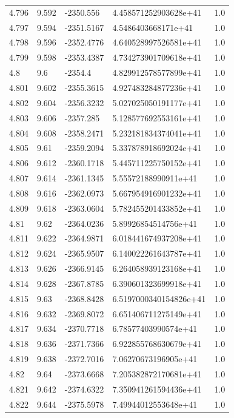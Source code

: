 \begin{tabular}{lllll}
4.796 & 9.592 & -2350.556 & 4.458571252903628e+41 & 1.0 \\
4.797 & 9.594 & -2351.5167 & 4.5486403668171e+41 & 1.0 \\
4.798 & 9.596 & -2352.4776 & 4.640528997526581e+41 & 1.0 \\
4.799 & 9.598 & -2353.4387 & 4.734273901709618e+41 & 1.0 \\
4.8 & 9.6 & -2354.4 & 4.829912578577899e+41 & 1.0 \\
4.801 & 9.602 & -2355.3615 & 4.927483284877236e+41 & 1.0 \\
4.802 & 9.604 & -2356.3232 & 5.027025050191177e+41 & 1.0 \\
4.803 & 9.606 & -2357.285 & 5.128577692553161e+41 & 1.0 \\
4.804 & 9.608 & -2358.2471 & 5.232181834374041e+41 & 1.0 \\
4.805 & 9.61 & -2359.2094 & 5.337878918692024e+41 & 1.0 \\
4.806 & 9.612 & -2360.1718 & 5.445711225750152e+41 & 1.0 \\
4.807 & 9.614 & -2361.1345 & 5.55572188990911e+41 & 1.0 \\
4.808 & 9.616 & -2362.0973 & 5.667954916901232e+41 & 1.0 \\
4.809 & 9.618 & -2363.0604 & 5.782455201433852e+41 & 1.0 \\
4.81 & 9.62 & -2364.0236 & 5.89926854514756e+41 & 1.0 \\
4.811 & 9.622 & -2364.9871 & 6.018441674937208e+41 & 1.0 \\
4.812 & 9.624 & -2365.9507 & 6.140022261643787e+41 & 1.0 \\
4.813 & 9.626 & -2366.9145 & 6.264058939123168e+41 & 1.0 \\
4.814 & 9.628 & -2367.8785 & 6.390601323699918e+41 & 1.0 \\
4.815 & 9.63 & -2368.8428 & 6.5197000340154826e+41 & 1.0 \\
4.816 & 9.632 & -2369.8072 & 6.651406711275149e+41 & 1.0 \\
4.817 & 9.634 & -2370.7718 & 6.78577403990574e+41 & 1.0 \\
4.818 & 9.636 & -2371.7366 & 6.922855768630679e+41 & 1.0 \\
4.819 & 9.638 & -2372.7016 & 7.06270673196905e+41 & 1.0 \\
4.82 & 9.64 & -2373.6668 & 7.205382872170681e+41 & 1.0 \\
4.821 & 9.642 & -2374.6322 & 7.350941261594436e+41 & 1.0 \\
4.822 & 9.644 & -2375.5978 & 7.49944012553648e+41 & 1.0 \\

\end{tabular}
